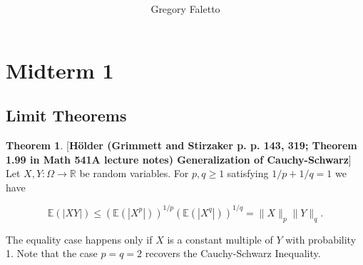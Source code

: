 \documentclass{article}
\title{
    \vspace{2in}
    \textmd{\textbf{ \hmwkTitle}}\\
}
\author{Gregory Faletto}
\date{}
\newcommand{\E}{\mathbb{E}}
\theoremstyle{definition}
\newtheorem{theorem}{Theorem}
\theoremstyle{definition}
\newtheorem{proposition}[theorem]{Proposition}
\theoremstyle{definition}
\theoremstyle{definition}
\theoremstyle{definition}
\newtheorem{definition}{Definition}[section]
\theoremstyle{definition}
\theoremstyle{definition}
\begin{document}
\maketitle

\pagebreak

\tableofcontents

%
%



\newpage

\section{Midterm 1}



%
%
%
%

\subsection{Limit Theorems}

\begin{theorem}\label{asym.thm.holder.ineq}[\textbf{H\"{o}lder (Grimmett and Stirzaker p. p. 143, 319; Theorem 1.99 in Math 541A lecture notes) Generalization of Cauchy-Schwarz}] Let \(X, Y : \Omega \to \mathbb{R}\) be random variables. For \(p, q \geq 1\) satisfying \(1/p + 1/q =1\) we have

\[
\E(|XY|) \leq (\E(|X^p|))^{1/p}(\E(|X^q|))^{1/q} = \lVert X \rVert_p \lVert Y \rVert_q.
\]

The equality case happens only if \(X\) is a constant multiple of \(Y\) with probability 1. Note that the case \(p=q=2\) recovers the Cauchy-Schwarz Inequality.
\end{theorem}
\end{document}
